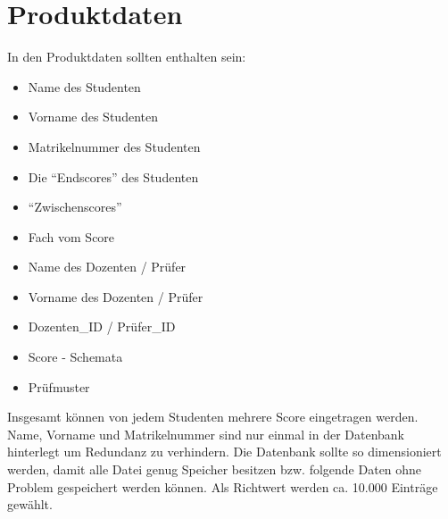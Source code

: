 \chapter{Produktdaten}
	In den Produktdaten sollten enthalten sein:
	\begin{itemize}
		\item Name des Studenten
		\item Vorname des Studenten
		\item Matrikelnummer des Studenten
		\item Die "`Endscores"' des Studenten
		\item "`Zwischenscores"' 
		\item Fach vom Score 
		\item Name des Dozenten / Prüfer
		\item Vorname des Dozenten / Prüfer
		\item Dozenten\_ID / Prüfer\_ID
		\item Score - Schemata
		\item Prüfmuster

	\end{itemize}
	Insgesamt können von jedem Studenten mehrere Score eingetragen werden. Name, Vorname und Matrikelnummer sind nur einmal in der Datenbank hinterlegt um Redundanz zu verhindern. 
	Die Datenbank sollte so dimensioniert werden, damit alle Datei genug Speicher besitzen bzw. folgende Daten ohne Problem gespeichert werden können. Als Richtwert werden ca. 10.000 Einträge gewählt. 